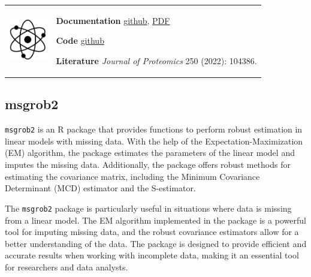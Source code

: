 \documentclass[
]{book}
\begin{document}
\begin{longtable}[]{@{}
  >{\raggedright\arraybackslash}p{}
  >{\raggedright\arraybackslash}p{}@{}}
\toprule\noalign{}
\endhead
\bottomrule\noalign{}
\endlastfoot
\includegraphics[width=\textwidth,height=0.70833in]{images/05.png} & \textbf{Documentation} \textbar{} \href{https://github.com/YanglabWCH/StatsPro\#Readme}{github}, \href{https://github.com/YanglabWCH/StatsPro/blob/main/StatsPro_Manual.pdf}{PDF}

\textbf{Code} \textbar{} \href{https://github.com/YanglabWCH/StatsPro}{github}

\textbf{Literature} \textbar{} \emph{Journal of Proteomics} 250 (2022): 104386. \\
\end{longtable}

\hfill\break

\hypertarget{msgrob2}{%
\subsection*{msgrob2}\label{msgrob2}}

\texttt{msgrob2} is an R package that provides functions to perform robust estimation in linear models with missing data. With the help of the Expectation-Maximization (EM) algorithm, the package estimates the parameters of the linear model and imputes the missing data. Additionally, the package offers robust methods for estimating the covariance matrix, including the Minimum Covariance Determinant (MCD) estimator and the S-estimator.

The \texttt{msgrob2} package is particularly useful in situations where data is missing from a linear model. The EM algorithm implemented in the package is a powerful tool for imputing missing data, and the robust covariance estimators allow for a better understanding of the data. The package is designed to provide efficient and accurate results when working with incomplete data, making it an essential tool for researchers and data analysts.

\hfill\break
\end{document}
